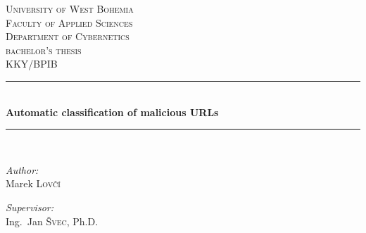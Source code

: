 \linespread{1}

\begin{titlepage}

    \newcommand{\HRule}{\rule{\linewidth}{0.5mm}} %

    \center{} %


    \textsc{\LARGE University of West Bohemia}\\[.5cm] %
    \textsc{\Large Faculty of Applied Sciences}\\[.5cm] %
    \textsc{\Large Department of Cybernetics}\\[1.5cm] %

    \textsc{\Large bachelor's thesis}\\[0.5cm] %
    \textsc{\large KKY/BPIB}\\[0.5cm] %


    \HRule{} \\[0.4cm]
    {\huge \bfseries Automatic classification of malicious URLs}\\ %
    \HRule{} \\[1.5cm]


    \begin{minipage}[t]{0.4\textwidth}
        \begin{flushleft}
            \large \emph{Author:}\\
            Marek \textsc{Lovčí}
        \end{flushleft}
    \end{minipage}
    \begin{minipage}[t]{0.4\textwidth}
        \begin{flushright}
            \large \emph{Supervisor:}\\
            Ing.\ Jan \textsc{Švec}, Ph.D\@.
        \end{flushright}
    \end{minipage}\\[7.5cm] %


\end{titlepage}
